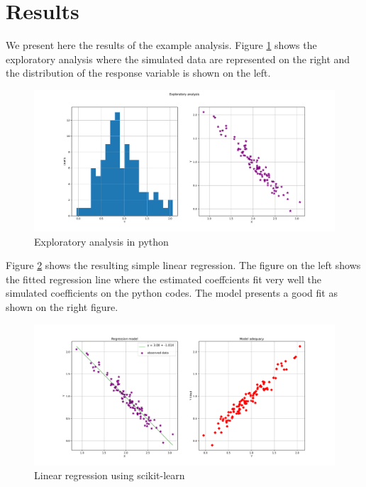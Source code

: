 \section{Results}


We present here the results of the example analysis. Figure \ref{fig:exploratory_analysis} shows the exploratory analysis where the simulated data are represented on the right and the distribution of the response variable is shown on the left.

\begin{figure}
\centering
\includegraphics[width=\textwidth]{figures/fig_exploratory_analysis.pdf}
\caption{Exploratory analysis in python}
\label{fig:exploratory_analysis}
\end{figure}

Figure \ref{fig:linear_regression} shows the resulting simple linear regression. The figure on the left shows the fitted regression line where the estimated coeffcients fit very well the simulated coefficients on the python codes. The model presents a good fit as shown on the right figure. 

\begin{figure}
\centering
\includegraphics[width=\textwidth]{figures/fig_linear_regression.pdf}
\caption{Linear regression using scikit-learn}
\label{fig:linear_regression}
\end{figure}